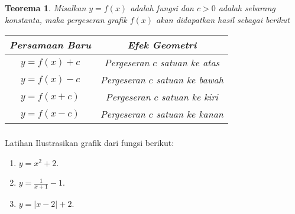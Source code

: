 \documentclass[aspectratio=169]{beamer}
\newtheorem{teorema}{Teorema}
\theoremstyle{definition}
\begin{document}
    \begin{frame}
        \frametitle{\insertsection}
        \begin{teorema}
            Misalkan $y=f(x)$ adalah fungsi dan $c>0$ adalah sebarang konstanta, maka pergeseran grafik $f(x)$ akan didapatkan hasil sebagai berikut 
            \begin{center}
                \begin{tabular}{c|c}
                    Persamaan Baru & Efek Geometri\\
                    \hline
                    $y=f(x)+c$ & Pergeseran $c$ satuan ke atas\\
                    $y=f(x)-c$ & Pergeseran $c$ satuan ke bawah\\
                    $y=f(x+c)$ & Pergeseran $c$ satuan ke kiri\\
                    $y=f(x-c)$ & Pergeseran $c$ satuan ke kanan\\
                \end{tabular}
            \end{center}
        \end{teorema}
    \end{frame}

    \begin{frame}
        \frametitle{\insertsection}
        \begin{exampleblock}{Latihan}
            Ilustrasikan grafik dari fungsi berikut:
            \begin{enumerate}[label=(\alph*)]
                \item $y=x^2+2$.
                \item $y=\displaystyle\frac{1}{x+1}-1$.
                \item $y=|x-2|+2$.
            \end{enumerate}
        \end{exampleblock}
    \end{frame}
\end{document}
